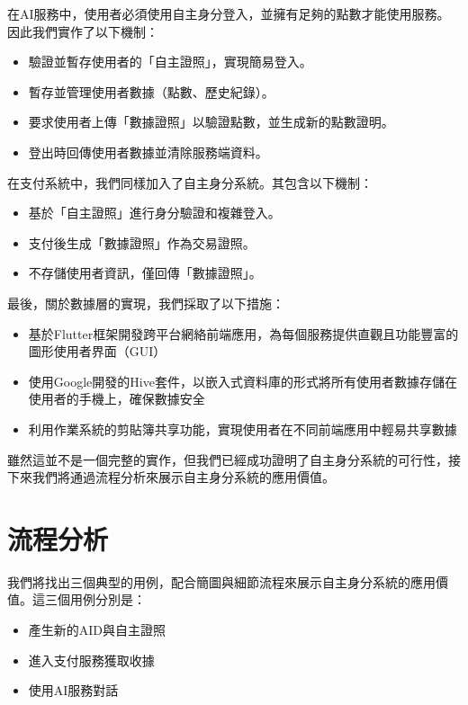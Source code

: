在AI服務中，使用者必須使用自主身分登入，並擁有足夠的點數才能使用服務。因此我們實作了以下機制：
\begin{itemize}
  \item 驗證並暫存使用者的「自主證照」，實現簡易登入。
  \item 暫存並管理使用者數據（點數、歷史紀錄）。
  \item 要求使用者上傳「數據證照」以驗證點數，並生成新的點數證明。
  \item 登出時回傳使用者數據並清除服務端資料。
\end{itemize}
在支付系統中，我們同樣加入了自主身分系統。其包含以下機制：
\begin{itemize}
  \item 基於「自主證照」進行身分驗證和複雜登入。
  \item 支付後生成「數據證照」作為交易證照。
  \item 不存儲使用者資訊，僅回傳「數據證照」。
\end{itemize}
最後，關於數據層的實現，我們採取了以下措施：
\begin{itemize}
  \item 基於Flutter框架開發跨平台網絡前端應用，為每個服務提供直觀且功能豐富的圖形使用者界面（GUI）
  \item 使用Google開發的Hive套件，以嵌入式資料庫的形式將所有使用者數據存儲在使用者的手機上，確保數據安全
  \item 利用作業系統的剪貼簿共享功能，實現使用者在不同前端應用中輕易共享數據
\end{itemize}
雖然這並不是一個完整的實作，但我們已經成功證明了自主身分系統的可行性，接下來我們將通過流程分析來展示自主身分系統的應用價值。
\section{流程分析}
我們將找出三個典型的用例，配合簡圖與細節流程來展示自主身分系統的應用價值。這三個用例分別是：
\begin{itemize}
  \item 產生新的AID與自主證照
  \item 進入支付服務獲取收據
  \item 使用AI服務對話
\end{itemize}

